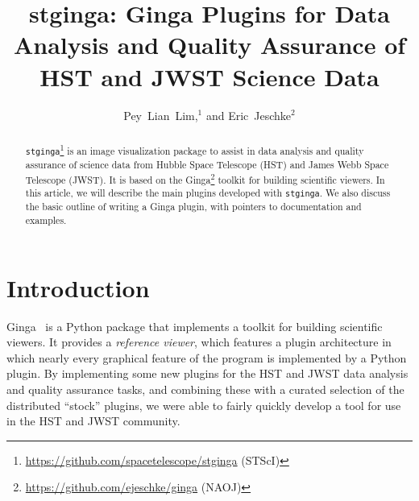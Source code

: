 \documentclass[11pt,twoside]{article}
\begin{document}
\title{stginga: Ginga Plugins for Data Analysis and Quality Assurance of HST and JWST Science Data}

\author{Pey~Lian~Lim,$^1$ and Eric~Jeschke$^2$
  }




\begin{abstract}

{\tt stginga}\footnote{\url{https://github.com/spacetelescope/stginga} (STScI)}
is an image visualization package to assist
in data analysis and quality assurance of science data from Hubble Space
Telescope (HST) and James Webb Space Telescope (JWST).  It is based on the
Ginga\footnote{\url{https://github.com/ejeschke/ginga} (NAOJ)} toolkit for
building scientific viewers.
In this article, we will describe the main plugins developed
with {\tt stginga}.  We also discuss the
basic outline of writing a Ginga plugin, with pointers to documentation
and examples.

\end{abstract}

\section{Introduction}

Ginga~\citep{Jeschke15A} is a Python package that
implements a toolkit for building scientific viewers.  It provides
a \emph{reference viewer}, which features
a plugin architecture in which nearly every graphical feature of the
program is implemented by a Python plugin.
By implementing some new plugins for the HST and JWST data analysis and
quality assurance tasks, and combining these with a curated selection of
the distributed ``stock'' plugins, we were able to fairly quickly
develop a tool for use in the HST and JWST community.
\end{document}
